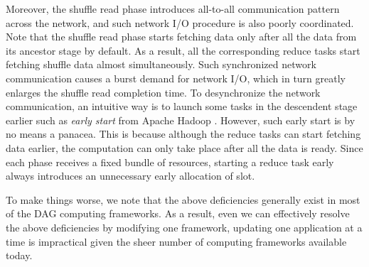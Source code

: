 Moreover, the shuffle read phase introduces all-to-all communication pattern across the network, and such network I/O procedure is also poorly coordinated.
Note that the shuffle read phase starts fetching data only after all the data from its ancestor stage by default. As a result, all the corresponding reduce tasks start fetching shuffle data almost simultaneously.
Such synchronized network communication causes a burst demand for network I/O, which in turn greatly enlarges the shuffle read completion time. To desynchronize the network communication, an intuitive way is to launch some tasks in the descendent stage earlier such as \textit{early start} from Apache Hadoop \cite{hadoop}. However, such early start is by no means a panacea. This is because although the reduce tasks can start fetching data earlier, the computation can only take place after all the data is ready. Since each phase receives a fixed bundle of resources, starting a reduce task early always introduces an unnecessary early allocation of slot.



To make things worse, we note that the above deficiencies generally exist in most of the DAG computing frameworks. As a result, even we can effectively resolve the above deficiencies by modifying one framework, updating one application at a time is impractical given the sheer number of computing frameworks available today.

